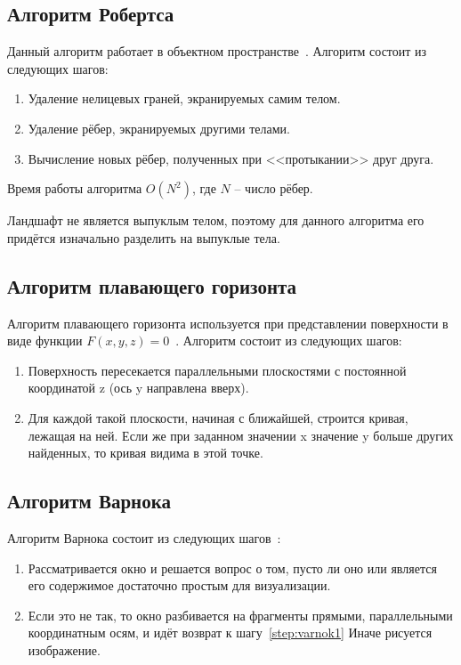 \subsection{Алгоритм Робертса}

Данный алгоритм работает в объектном пространстве~\cite{lost}. Алгоритм состоит из следующих шагов: 

\begin{enumerate}[label=\arabic*.]
	\item Удаление нелицевых граней, экранируемых самим телом.
	\item Удаление рёбер, экранируемых другими телами.
	\item Вычисление новых рёбер, полученных при <<протыкании>> друг друга.
\end{enumerate}

Время работы алгоритма $O(N^2)$, где $N$ -- число рёбер.

Ландшафт не является выпуклым телом, поэтому для данного алгоритма его придётся изначально разделить на выпуклые тела.

\subsection{Алгоритм плавающего горизонта}

Алгоритм плавающего горизонта используется при представлении поверхности в виде функции $F(x,y,z)=0$~\cite{golovnin}. Алгоритм состоит из следующих шагов:

\begin{enumerate}[label=\arabic*.]
	\item Поверхность пересекается параллельными плоскостями с постоянной координатой z (ось y направлена вверх).
	\item Для каждой такой плоскости, начиная с ближайшей, строится кривая, лежащая на ней. Если же при заданном значении x значение y больше других найденных, то кривая видима в этой точке.
\end{enumerate}

\subsection{Алгоритм Варнока}

Алгоритм Варнока состоит из следующих шагов~\cite{cannon}:

\begin{enumerate}[label=\arabic*.]
	\item \label{step:varnok1}Рассматривается окно и решается вопрос о том, пусто ли оно
	или является его содержимое достаточно простым для визуализации.
	\item Если это не так, то окно разбивается на фрагменты прямыми, параллельными координатным осям, и идёт возврат к шагу~\ref{step:varnok1} Иначе рисуется изображение.
\end{enumerate}

